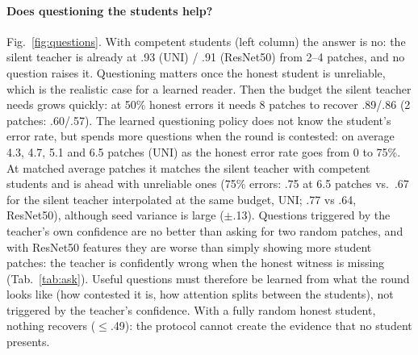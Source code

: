 \documentclass[10pt,twocolumn,letterpaper]{article}
\begin{document}
\paragraph{Does questioning the students help?} Fig.~\ref{fig:questions}. With competent students (left column) the answer is no: the silent teacher is already at .93 (UNI) / .91 (ResNet50) from 2--4 patches, and no question raises it. Questioning matters once the honest student is unreliable, which is the realistic case for a learned reader. Then the budget the silent teacher needs grows quickly: at 50\% honest errors it needs 8 patches to recover .89/.86 (2 patches: .60/.57). The learned questioning policy does not know the student's error rate, but spends more questions when the round is contested: on average 4.3, 4.7, 5.1 and 6.5 patches (UNI) as the honest error rate goes from 0 to 75\%. At matched average patches it matches the silent teacher with competent students and is ahead with unreliable ones (75\% errors: .75 at 6.5 patches vs.\ .67 for the silent teacher interpolated at the same budget, UNI; .77 vs .64, ResNet50), although seed variance is large ($\pm$.13). Questions triggered by the teacher's own confidence are no better than asking for two random patches, and with ResNet50 features they are worse than simply showing more student patches: the teacher is confidently wrong when the honest witness is missing (Tab.~\ref{tab:ask}). Useful questions must therefore be learned from what the round looks like (how contested it is, how attention splits between the students), not triggered by the teacher's confidence. With a fully random honest student, nothing recovers ($\le$.49): the protocol cannot create the evidence that no student presents.
\end{document}
